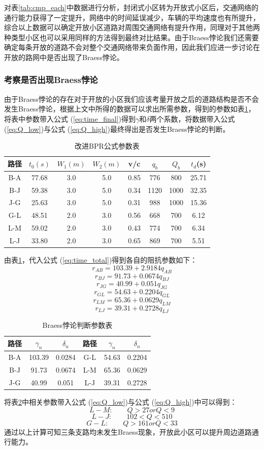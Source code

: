 \documentclass[fontset=fandol,a4paper,12pt]{ctexart}
\renewcommand{\eqref}[1]{公式 (\ref{#1})}
\begin{document}
		对表\ref{tab:cmp_each}中数据进行分析，封闭式小区转为开放式小区后，交通网络的通行能力获得了一定提升，网络中的时间延误减少，车辆的平均速度也有所提升，综合以上数据可以确定开放小区道路对周围交通网络有提升作用，同理对于其他两种类型小区也可以采用同样的方法得到最终对比结果。由于Braess悖论我们还需要确定每条开放的道路不会对整个交通网络带来负面作用，因此我们应进一步讨论在开放的路网中是否出现了Braess悖论。	
		\subsubsection{考察是否出现Braess悖论}
			由于Braess悖论的存在对于开放的小区我们应该考量开放之后的道路结构是否不会发生Braess悖论，根据上文中所得的数据可以求出所需参数，得到的参数如表\ref{tab:braess_args}，将表中参数带入\eqref{eq:time_final}得到$\gamma$和$\delta$两个系数，将数据带入\eqref{eq:Q_low}与\eqref{eq:Q_high}最终得出是否发生Braess悖论的判断。
			\begin{table}[!htbp]
				\centering
				\caption{改进BPR公式参数表}
				\label{tab:braess_args}
				\begin{tabular}{c|ccccccc}
					\toprule[1pt] 
					路径&	$t_0(s)$&	$W_1(m)$&	$W_2(m)$&	v/c&	$q_b$& $Q_b$&	$t_d$(s)\\
					\hline
					B-A& 77.68& 3.0& 5.0& 0.85& 776&800&25.71\\
					B-J& 59.38& 3.0& 5.0& 0.34& 1120&1000&32.35\\
					J-G& 25.63&	3.0& 5.0& 0.31& 988& 1000&15.36\\
					G-L& 48.51& 2.0& 3.0& 0.56& 668& 700&6.12\\
					L-M& 59.02& 2.0& 3.0& 0.43& 774& 700&6.34\\
					L-J& 33.80& 2.0& 3.0& 0.65& 869& 700&5.51\\
					\bottomrule[1pt]
				\end{tabular} 
			\end{table}
			由表\ref{tab:braess_args}，代入\eqref{eq:time_total}得到各自的阻抗参数如下：
			$$r_{AB}=103.39+2.9184q_{AB}$$
			$$r_{BJ}=91.73+0.0674q_{BJ}$$
			$$r_{JG}=40.99+0.051q_{JG}$$
			$$r_{GL}=54.63+0.2204q_{GL}$$
			$$r_{LM}=65.36+0.0629q_{LM}$$
			$$r_{LJ}=39.31+0.2728q_{LJ}$$
			\begin{table}[!htbp]
				\centering
				\caption{Braess悖论判断参数表}
				\label{tab:braess_judge}
				\begin{tabular}{c|cc|c|cc}
					\toprule[1pt] 
					路径&	$\gamma_n$&	$\delta_n$&	路径&	$\gamma_n$&	$\delta_n$\\
					\hline
					B-A& 103.39& 0.0284& G-L& 54.63& 0.2204\\
					B-J& 91.73& 0.0674& L-M& 65.36& 0.0629\\
					J-G& 40.99&	0.051& L-J& 39.31& 0.2728\\
					\bottomrule[1pt]
				\end{tabular} 
			\end{table}
			将表\ref{tab:braess_judge}中相关参数带入\eqref{eq:Q_low}与\eqref{eq:Q_high}中可以得到：
			$$L-M:\qquad Q>27 or Q<9 $$
			$$L-J:\qquad 102<Q<510 $$
			$$G-L:\qquad Q>161 or Q<33 $$
			通过以上计算可知三条支路均未发生Braess现象，开放此小区可以提升周边道路通行能力。
			
\end{document}
